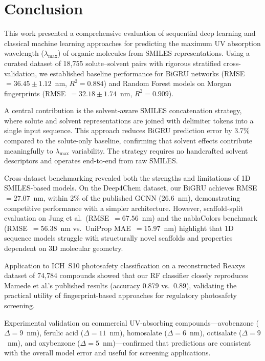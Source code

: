 \documentclass[11pt,a4paper]{article}
\begin{document}
\section{Conclusion}

This work presented a comprehensive evaluation of sequential deep learning and classical machine learning approaches for predicting the maximum UV absorption wavelength ($\lambda_{\max}$) of organic molecules from SMILES representations. Using a curated dataset of 18,755 solute--solvent pairs with rigorous stratified cross-validation, we established baseline performance for BiGRU networks (RMSE~$= 36.45 \pm 1.12$~nm, $R^2 = 0.884$) and Random Forest models on Morgan fingerprints (RMSE~$= 32.18 \pm 1.74$~nm, $R^2 = 0.909$).

A central contribution is the solvent-aware SMILES concatenation strategy, where solute and solvent representations are joined with delimiter tokens into a single input sequence. This approach reduces BiGRU prediction error by 3.7\% compared to the solute-only baseline, confirming that solvent effects contribute meaningfully to $\lambda_{\max}$ variability. The strategy requires no handcrafted solvent descriptors and operates end-to-end from raw SMILES.

Cross-dataset benchmarking revealed both the strengths and limitations of 1D SMILES-based models. On the Deep4Chem dataset, our BiGRU achieves RMSE~$= 27.07$~nm, within 2\% of the published GCNN (26.6~nm), demonstrating competitive performance with a simpler architecture. However, scaffold-split evaluation on Jung et al.\ (RMSE~$= 67.56$~nm) and the nablaColors benchmark (RMSE~$= 56.38$~nm vs.\ UniProp MAE~$= 15.97$~nm) highlight that 1D sequence models struggle with structurally novel scaffolds and properties dependent on 3D molecular geometry.

Application to ICH~S10 photosafety classification on a reconstructed Reaxys dataset of 74,784 compounds showed that our RF classifier closely reproduces Mamede et al.'s published results (accuracy 0.879 vs.\ 0.89), validating the practical utility of fingerprint-based approaches for regulatory photosafety screening.

Experimental validation on commercial UV-absorbing compounds---avobenzone ($\Delta = 9$~nm), ferulic acid ($\Delta = 11$~nm), homosalate ($\Delta = 6$~nm), octisalate ($\Delta = 9$~nm), and oxybenzone ($\Delta = 5$~nm)---confirmed that predictions are consistent with the overall model error and useful for screening applications.
\end{document}
